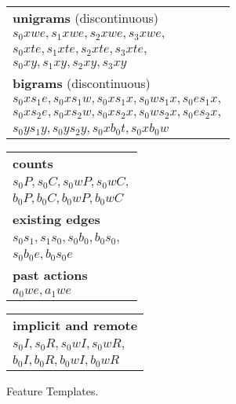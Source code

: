 \documentclass[11pt]{article}
\begin{document}
\begin{figure*}
\begin{adjustbox}{width=\textwidth}
\begin{minipage}[c][11cm][t]{.5\textwidth}
\vspace*{\fill}
\begin{tabular}{l}
\textbf{unigrams} (discontinuous) \\
$s_0xwe, s_1xwe, s_2xwe, s_3xwe,$ \\
$s_0xte, s_1xte, s_2xte, s_3xte,$ \\
$s_0xy, s_1xy, s_2xy, s_3xy$ \\
\textbf{bigrams} (discontinuous) \\
$s_0xs_1e, s_0xs_1w, s_0xs_1x, s_0ws_1x, s_0es_1x,$ \\
$s_0xs_2e, s_0xs_2w, s_0xs_2x, s_0ws_2x, s_0es_2x,$ \\
$s_0ys_1y, s_0ys_2y, s_0xb_0t, s_0xb_0w$
\end{tabular}

\vspace*{\fill}
\begin{tabular}{l}
\textbf{counts} \\
$s_0P, s_0C, s_0wP, s_0wC,$ \\
$b_0P, b_0C, b_0wP, b_0wC$ \\
\textbf{existing edges} \\
$s_0s_1, s_1s_0, s_0b_0, b_0s_0,$ \\
$s_0b_0e, b_0s_0e$ \\
\textbf{past actions} \\
$a_0we, a_1we$
\end{tabular}

\vspace*{\fill}
\begin{tabular}{l}
\textbf{implicit and remote} \\
$s_0I, s_0R, s_0wI, s_0wR,$ \\
$b_0I, b_0R, b_0wI, b_0wR$
\end{tabular}
\end{minipage}
\end{adjustbox}
\caption{Feature Templates.\label{fig:features}}
\end{figure*}
\end{document}
